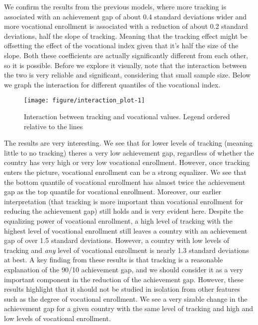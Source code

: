 \documentclass[11pt, a4paper]{article}\usepackage[]{graphicx}\usepackage[]{color}
\begin{document}
We confirm the results from the previous models, where more tracking is associated with an achievement gap of about 0.4 standard deviations wider and more vocational enrollment is associated with a reduction of about 0.2 standard deviations, half the slope of tracking. Meaning that the tracking effect might be offsetting the effect of the vocational index given that it's half the size of the slope. Both these coefficients are actually significantly different from each other, so it is possible. Before we explore it visually, note that the interaction between the two is very reliable and significant, considering that small sample size. Below we graph the interaction for different quantiles of the vocational index.



\begin{figure}

{\centering \texttt{[image: figure/interaction\_plot-1]} 

}

\caption[Interaction between tracking and vocational values]{Interaction between tracking and vocational values. Legend ordered relative to the lines}\label{fig:interaction_plot}
\end{figure}



The results are very interesting. We see that for lower levels of tracking (meaning little to no tracking) theres a very low achievement gap, regardless of whether the country has very high or very low vocational enrollment. However, once tracking enters the picture, vocational enrollment can be a strong equalizer. We see that the bottom quantile of vocational enrollment has almost twice the achievement gap as the top quantile for vocational enrollment. Moreover, our earlier interpretation (that tracking is more important than vocational enrollment for reducing the achievement gap) still holds and is very evident here. Despite the equalizing power of vocational enrollment, a high level of tracking with the highest level of vocational enrollment still leaves a country with an achievement gap of over 1.5 standard deviations. However, a country with low levels of tracking and \textit{any} level of vocational enrollment is nearly 1.3 standard deviations at best. A key finding from these results is that tracking is a reasonable explanation of the 90/10 achievement gap, and we should consider it as a very important component in the reduction of the achievement gap. However, these results highlight that it should not be studied in isolation from other features such as the degree of vocational enrollment. We see a very sizable change in the achievement gap for a given country with the same level of tracking and high and low levels of vocational enrollment.
\end{document}
